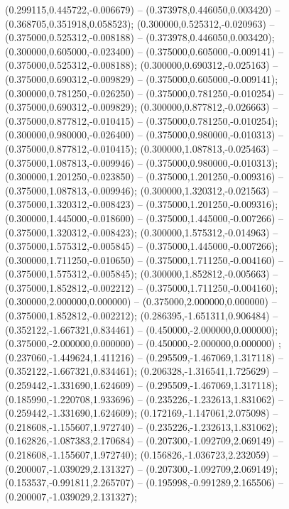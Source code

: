  (0.299115,0.445722,-0.006679) -- (0.373978,0.446050,0.003420) -- (0.368705,0.351918,0.058523);
 (0.300000,0.525312,-0.020963) -- (0.375000,0.525312,-0.008188) -- (0.373978,0.446050,0.003420);
 (0.300000,0.605000,-0.023400) -- (0.375000,0.605000,-0.009141) -- (0.375000,0.525312,-0.008188);
 (0.300000,0.690312,-0.025163) -- (0.375000,0.690312,-0.009829) -- (0.375000,0.605000,-0.009141);
 (0.300000,0.781250,-0.026250) -- (0.375000,0.781250,-0.010254) -- (0.375000,0.690312,-0.009829);
 (0.300000,0.877812,-0.026663) -- (0.375000,0.877812,-0.010415) -- (0.375000,0.781250,-0.010254);
 (0.300000,0.980000,-0.026400) -- (0.375000,0.980000,-0.010313) -- (0.375000,0.877812,-0.010415);
 (0.300000,1.087813,-0.025463) -- (0.375000,1.087813,-0.009946) -- (0.375000,0.980000,-0.010313);
 (0.300000,1.201250,-0.023850) -- (0.375000,1.201250,-0.009316) -- (0.375000,1.087813,-0.009946);
 (0.300000,1.320312,-0.021563) -- (0.375000,1.320312,-0.008423) -- (0.375000,1.201250,-0.009316);
 (0.300000,1.445000,-0.018600) -- (0.375000,1.445000,-0.007266) -- (0.375000,1.320312,-0.008423);
 (0.300000,1.575312,-0.014963) -- (0.375000,1.575312,-0.005845) -- (0.375000,1.445000,-0.007266);
 (0.300000,1.711250,-0.010650) -- (0.375000,1.711250,-0.004160) -- (0.375000,1.575312,-0.005845);
 (0.300000,1.852812,-0.005663) -- (0.375000,1.852812,-0.002212) -- (0.375000,1.711250,-0.004160);
 (0.300000,2.000000,0.000000) -- (0.375000,2.000000,0.000000) -- (0.375000,1.852812,-0.002212);
 (0.286395,-1.651311,0.906484) -- (0.352122,-1.667321,0.834461) -- (0.450000,-2.000000,0.000000);
 (0.375000,-2.000000,0.000000) -- (0.450000,-2.000000,0.000000) ;
 (0.237060,-1.449624,1.411216) -- (0.295509,-1.467069,1.317118) -- (0.352122,-1.667321,0.834461);
 (0.206328,-1.316541,1.725629) -- (0.259442,-1.331690,1.624609) -- (0.295509,-1.467069,1.317118);
 (0.185990,-1.220708,1.933696) -- (0.235226,-1.232613,1.831062) -- (0.259442,-1.331690,1.624609);
 (0.172169,-1.147061,2.075098) -- (0.218608,-1.155607,1.972740) -- (0.235226,-1.232613,1.831062);
 (0.162826,-1.087383,2.170684) -- (0.207300,-1.092709,2.069149) -- (0.218608,-1.155607,1.972740);
 (0.156826,-1.036723,2.232059) -- (0.200007,-1.039029,2.131327) -- (0.207300,-1.092709,2.069149);
 (0.153537,-0.991811,2.265707) -- (0.195998,-0.991289,2.165506) -- (0.200007,-1.039029,2.131327);
